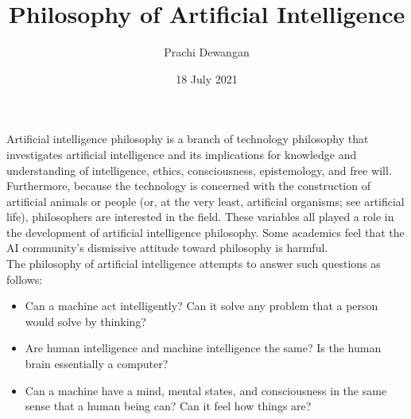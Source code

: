 \documentclass{article}
\title{\vspace{-3cm}Philosophy of Artificial Intelligence}
\author{Prachi Dewangan}
\date{18 July 2021}
\begin{document}
	\maketitle
	Artificial intelligence philosophy is a branch of technology philosophy that investigates artificial intelligence and its implications for knowledge and understanding of intelligence, ethics, consciousness, epistemology, and free will. Furthermore, because the technology is concerned with the construction of artificial animals or people (or, at the very least, artificial organisms; see artificial life), philosophers are interested in the field. These variables all played a role in the development of artificial intelligence philosophy. Some academics feel that the AI community's dismissive attitude toward philosophy is harmful.\\
	
	The philosophy of artificial intelligence attempts to answer such questions as follows:
	\begin{itemize}
		\item Can a machine act intelligently? Can it solve any problem that a person would solve by thinking?
	
		\item Are human intelligence and machine intelligence the same? Is the human brain essentially a computer?
	
		\item Can a machine have a mind, mental states, and consciousness in the same sense that a human being can? Can it feel how things are?
		
	
	
	\end{itemize}
	
\end{document}
